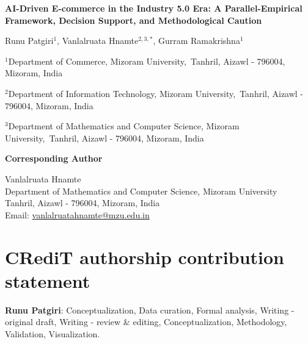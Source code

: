\documentclass[12pt,a4paper]{article}
\begin{document}
\begin{titlepage}

\begin{center}

\vspace*{1cm}

{\LARGE \bfseries
AI-Driven E-commerce in the Industry 5.0 Era: A Parallel-Empirical Framework, Decision Support, and Methodological Caution
\par}

\vspace{1.5cm}

{\large
Runu Patgiri$^{1}$, Vanlalruata Hnamte$^{2,3,*}$, Gurram Ramakrishna$^{1}$
}

\vspace{0.8cm}

$^{1}$Department of Commerce, Mizoram University,\
Tanhril, Aizawl - 796004, Mizoram, India

\vspace{0.3cm}

$^{2}$Department of Information Technology, Mizoram University,\
Tanhril, Aizawl - 796004, Mizoram, India

\vspace{0.3cm}

$^{3}$Department of Mathematics and Computer Science, Mizoram University,\
Tanhril, Aizawl - 796004, Mizoram, India

\vspace{1.2cm}

\textbf{Corresponding Author}

\vspace{0.2cm}

Vanlalruata Hnamte\\
Department of Mathematics and Computer Science, Mizoram University\\
Tanhril, Aizawl - 796004, Mizoram, India\\
Email: \href{mailto:vanlalruatahnamte@mzu.edu.in}{vanlalruatahnamte@mzu.edu.in}

\end{center}

\vspace{1cm}

\newpage

\section*{CRediT authorship contribution statement}
\textbf{Runu Patgiri}: Conceptualization, Data curation, Formal analysis, Writing - original draft, Writing - review \& editing, Conceptualization, Methodology, Validation, Visualization. \\


\end{titlepage}
\end{document}
